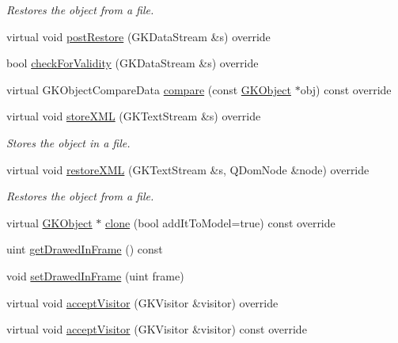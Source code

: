 \begin{DoxyCompactItemize}
\begin{DoxyCompactList}\small\item\em Restores the object from a file. \end{DoxyCompactList}\item 
virtual void \hyperlink{classGKGeoObject_ac3d477ad4b35bc0628c39081b4fc09ec}{post\+Restore} (G\+K\+Data\+Stream \&s) override
\item 
bool \hyperlink{classGKGeoObject_ad51f9b7b707899590228da2f4eec29e7}{check\+For\+Validity} (G\+K\+Data\+Stream \&s) override
\item 
virtual G\+K\+Object\+Compare\+Data \hyperlink{classGKGeoObject_aec2c201cfcc6e9740bbe67875f0aeb5c}{compare} (const \hyperlink{classGKObject}{G\+K\+Object} $\ast$obj) const override
\item 
virtual void \hyperlink{classGKGeoObject_a1ab5659f574c83ec6bd8e22fbc6c104a}{store\+X\+ML} (G\+K\+Text\+Stream \&s) override\hypertarget{classGKGeoObject_a1ab5659f574c83ec6bd8e22fbc6c104a}{}\label{classGKGeoObject_a1ab5659f574c83ec6bd8e22fbc6c104a}

\begin{DoxyCompactList}\small\item\em Stores the object in a file. \end{DoxyCompactList}\item 
virtual void \hyperlink{classGKGeoObject_a0a7885d3b95b0229be53bd1dd582b1a1}{restore\+X\+ML} (G\+K\+Text\+Stream \&s, Q\+Dom\+Node \&node) override\hypertarget{classGKGeoObject_a0a7885d3b95b0229be53bd1dd582b1a1}{}\label{classGKGeoObject_a0a7885d3b95b0229be53bd1dd582b1a1}

\begin{DoxyCompactList}\small\item\em Restores the object from a file. \end{DoxyCompactList}\item 
virtual \hyperlink{classGKObject}{G\+K\+Object} $\ast$ \hyperlink{classGKGeoObject_a342c5d7928c3c4e82cc44240078d4e27}{clone} (bool add\+It\+To\+Model=true) const override
\item 
uint \hyperlink{classGKGeoObject_a71276d56a112e8e6c63c286d15cf27b6}{get\+Drawed\+In\+Frame} () const 
\item 
void \hyperlink{classGKGeoObject_adaf0e387abe85f6b0127137d9107d56a}{set\+Drawed\+In\+Frame} (uint frame)
\item 
virtual void \hyperlink{classGKGeoObject_a7ba7ef1150e1b27c41b47b21c738b52a}{accept\+Visitor} (G\+K\+Visitor \&visitor) override
\item 
virtual void \hyperlink{classGKGeoObject_a8098da83ef0177983da38f045281cfa5}{accept\+Visitor} (G\+K\+Visitor \&visitor) const override
\end{DoxyCompactItemize}
